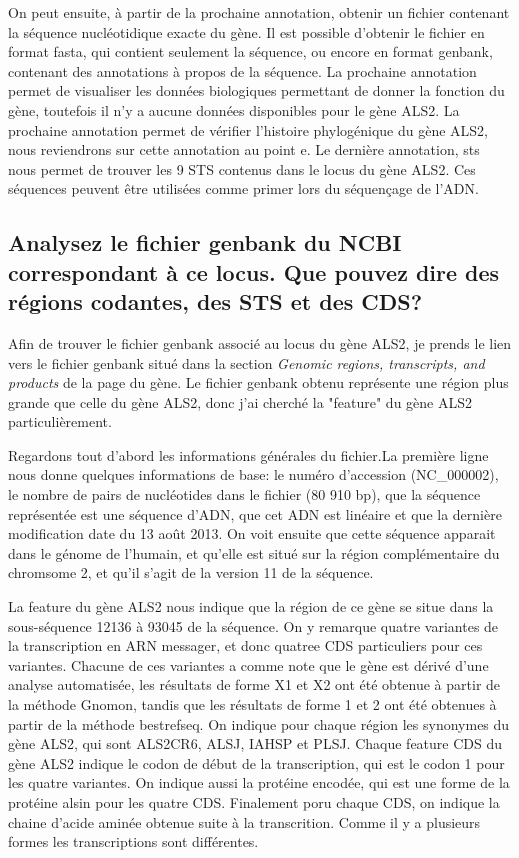 \documentclass[11pt]{article} %
\begin{document}
On peut ensuite, à partir de la prochaine annotation, obtenir un fichier contenant la séquence nucléotidique exacte du gène.
Il est possible d'obtenir le fichier en format fasta, qui contient seulement la séquence, ou encore en format genbank, contenant
des annotations à propos de la séquence. La prochaine annotation permet de visualiser les données biologiques permettant
de donner la fonction du gène, toutefois il n'y a aucune données disponibles pour le gène ALS2. La prochaine annotation permet
de vérifier l'histoire phylogénique du gène ALS2, nous reviendrons sur cette annotation au point e. Le dernière annotation, sts
nous permet de trouver les 9 STS contenus dans le locus du gène ALS2. Ces séquences peuvent être utilisées comme primer lors
du séquençage de l'ADN.

\subsection[Fichier genbank du gène ALS2]{Analysez le fichier genbank du NCBI correspondant à ce locus. Que pouvez dire des
régions codantes, des STS et des CDS?}

Afin de trouver le fichier genbank associé au locus du gène ALS2, je prends le lien vers le fichier genbank situé dans la section
\emph{Genomic regions, transcripts, and products} de la page du gène. Le fichier genbank obtenu représente une région plus
grande que celle du gène ALS2, donc j'ai cherché la "feature" du gène ALS2 particulièrement.

Regardons tout d'abord les informations générales du fichier.La première ligne nous donne quelques informations de base: le numéro
d'accession (NC\_000002), le nombre de pairs de nucléotides dans le fichier (80 910 bp), que la séquence représentée est une séquence
d'ADN, que cet ADN est linéaire et que la dernière modification date du 13 août 2013. On voit ensuite que cette séquence apparait 
dans le génome de l'humain, et qu'elle est situé sur la région complémentaire du chromsome 2, et qu'il s'agit de la version 11 de la
séquence.

La feature du gène ALS2 nous indique que la région de ce gène se situe dans la sous-séquence 12136 à  93045 de la séquence. On y 
remarque quatre variantes de la transcription en ARN messager, et donc quatree CDS particuliers pour ces variantes.
Chacune de ces variantes a comme note que le gène est dérivé d'une analyse automatisée, les résultats de forme X1 et X2 ont été
obtenue à partir de la méthode Gnomon, tandis que les résultats de forme 1 et 2 ont été obtenues à partir de la méthode
bestrefseq. On indique pour chaque région les synonymes du gène ALS2, qui sont ALS2CR6, ALSJ, IAHSP et PLSJ. Chaque feature CDS
du gène ALS2 indique le codon de début de la transcription, qui est le codon 1 pour les quatre variantes. On indique aussi la
protéine encodée, qui est une forme de la protéine alsin pour les quatre CDS. Finalement poru chaque CDS, on indique la
chaine d'acide aminée obtenue suite à la transcrition. Comme il y a plusieurs formes les transcriptions sont différentes.
\end{document}
